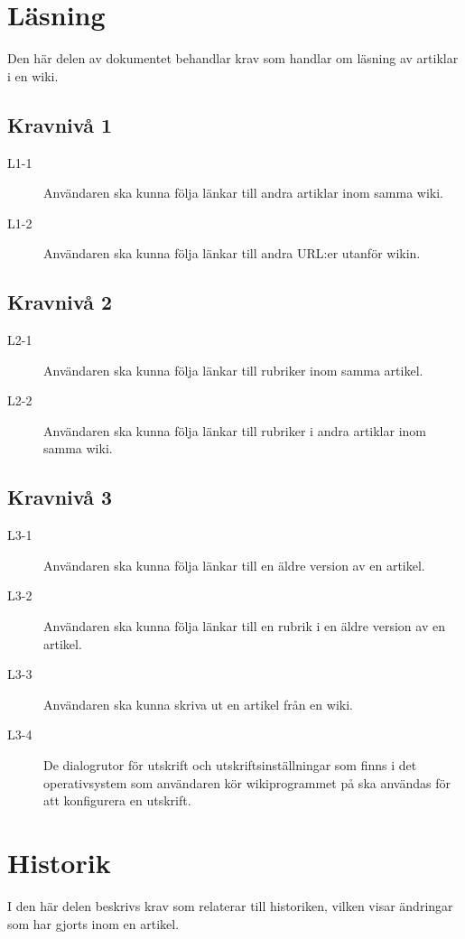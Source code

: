 \section{Läsning}
Den här delen av dokumentet behandlar krav som handlar om läsning av artiklar i en wiki.

\subsection{Kravnivå 1}
\begin{description}
\item[L1-1] Användaren ska kunna följa länkar till andra artiklar inom samma wiki.
\item[L1-2] Användaren ska kunna följa länkar till andra URL:er utanför wikin.
\end{description}

\subsection{Kravnivå 2}
\begin{description}
\item[L2-1] Användaren ska kunna följa länkar till rubriker inom samma artikel.
\item[L2-2] Användaren ska kunna följa länkar till rubriker i andra artiklar inom samma wiki.
\end{description}

\subsection{Kravnivå 3}
\begin{description}
\item[L3-1] Användaren ska kunna följa länkar till en äldre version av en artikel.
\item[L3-2] Användaren ska kunna följa länkar till en rubrik i en äldre version av en artikel.
\item[L3-3] Användaren ska kunna skriva ut en artikel från en wiki.
\item[L3-4] De dialogrutor för utskrift och utskriftsinställningar som finns i det operativsystem som användaren kör wikiprogrammet på ska användas för att konfigurera en utskrift.
\end{description}

\section{Historik}
I den här delen beskrivs krav som relaterar till historiken, vilken visar ändringar som har gjorts inom en artikel.

